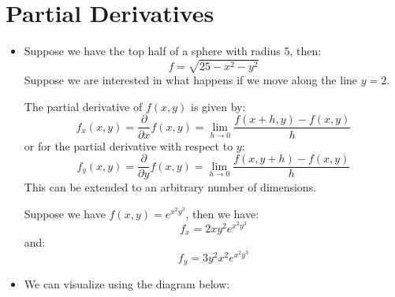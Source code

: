 \section{Partial Derivatives}
\begin{itemize}
    \item Suppose we have the top half of a sphere with radius $5$, then:
    \begin{equation}
        f=\sqrt{25-x^2-y^2}
    \end{equation}
    Suppose we are interested in what happens if we move along the line $y=2$.
    \begin{definition}
        The partial derivative of $f(x,y)$ is given by:
        \begin{equation}
            f_x(x,y) = \frac{\partial}{\partial x} f(x,y) = \lim_{h\to 0} \frac{f(x+h,y)-f(x,y)}{h}
        \end{equation}
        or for the partial derivative with respect to $y$:
        \begin{equation}
            f_y(x,y) = \frac{\partial}{\partial y}f(x,y) = \lim_{h\to 0} \frac{f(x,y+h)-f(x,y)}{h}
        \end{equation}
        This can be extended to an arbitrary number of dimensions.
    \end{definition}
    \begin{example}
        Suppose we have $f(x,y)=e^{x^2y^3}$, then we have:
        \begin{equation}
            f_x = 2xy^2e^{x^2y^3}
        \end{equation}
        and:
        \begin{equation}
            f_y=3y^2x^2e^{x^2y^3}
        \end{equation}
    \end{example}
    \item We can visualize using the diagram below:
    \begin{center}
\end{center}
\end{itemize}

